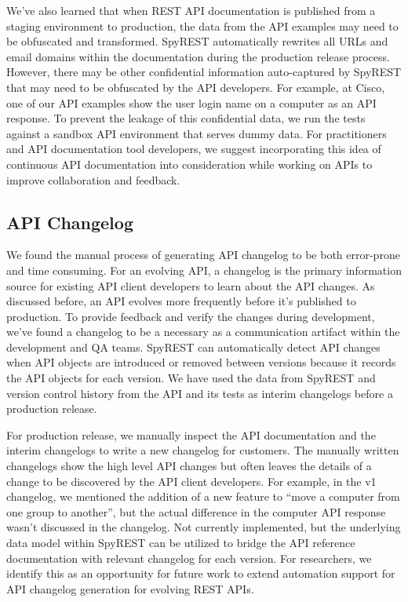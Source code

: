 \documentclass[10pt, conference]{IEEEtran}
\begin{document}
We've also learned that when REST API documentation is published from a staging environment to production, the data from the API examples may need to be obfuscated and transformed. SpyREST automatically rewrites all  URLs and email domains within the documentation during the production release process. However, there may be other confidential information auto-captured by SpyREST that may need to be obfuscated by the API developers. For example, at Cisco, one of our API examples show the user login name on a computer as an API response. To prevent the leakage of this confidential data, we run the tests against a sandbox API environment that serves dummy data. For practitioners and API documentation tool developers, we suggest incorporating this idea of continuous API documentation into consideration while working on APIs to improve collaboration and feedback.

\subsection{API Changelog}
We found the manual process of generating API changelog to be both error-prone and time consuming. For an evolving API, a changelog is the primary information source for existing API client developers to learn about the API changes. As discussed before, an API evolves more frequently before it's published to production. To provide feedback and verify the changes during development, we've found a changelog to be a necessary as a communication artifact within the development and QA teams. SpyREST can automatically detect API changes when API objects are introduced or removed between versions because it records the API objects for each version. We have used the data from SpyREST and version control history from the API and its tests as interim changelogs before a production release.

For production release, we manually inspect the API documentation and the interim changelogs to write a new changelog for customers. The manually written changelogs show the high level API changes but often leaves the details of a change to be discovered by the API client developers. For example, in the v1 changelog, we mentioned the addition of a new feature to ``move a computer from one group to another'', but the actual difference in the computer API response wasn't discussed in the changelog. Not currently implemented, but the underlying data model within SpyREST can be utilized to bridge the API reference documentation with relevant changelog for each version. For researchers, we identify this as an opportunity for future work to extend automation support for API changelog generation for evolving REST APIs.
\end{document}
